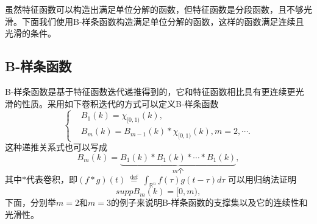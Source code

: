  虽然特征函数可以构造出满足单位分解的函数，但特征函数是分段函数，且不够光滑。下面我们使用B-样条函数构造满足单位分解的函数，这样的函数满足连续且光滑的条件。



\subsection{B-样条函数}
B-样条函数\cite{prochazkova2005derivative}是基于特征函数迭代递推得到的，它和特征函数相比具有更连续更光滑的性质。采用如下卷积迭代的方式可以定义B-样条函数
\begin{equation}
    \left\{\begin{matrix} 
&B_{1}(k)=\chi_{\lbrack0,1)}(k),\\
&B_{m}(k)=B_{m-1}(k)\ast\chi_{\lbrack0,1)}(k),m=2,\cdots.\label{b-spline}%
\end{matrix}\right. 
\end{equation}
这种递推关系式也可以写成
\begin{equation}
    B_{m}(k)=\underbrace{B_1(k) * B_{1}(k) * \cdots * B_{1}(k)}_{m \text{个}},
\end{equation}
其中$*$代表卷积，即$(f * g)(t) \stackrel{\text { def }}{=} \int_{\mathbb{R}^{n}} f(\tau) g(t-\tau) d \tau$
可以用归纳法证明
\begin{equation}
    supp B_{m}(k)=[0,m),
\end{equation}
下面，分别举$m=2$和$m=3$的例子来说明B-样条函数的支撑集以及它的连续性和光滑性。

